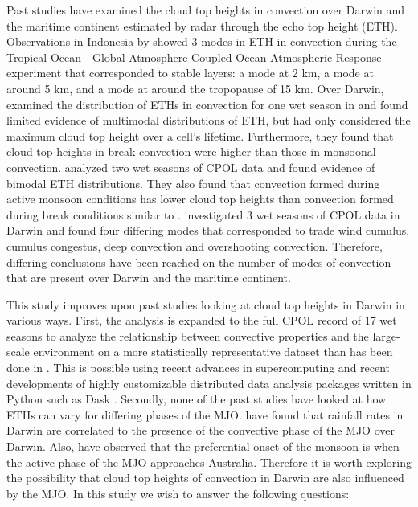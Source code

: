 \documentclass[journal abbreviation, manuscript]{copernicus}
\begin{document}
    Past studies have examined the cloud top heights in convection over Darwin and the maritime continent estimated by radar through the echo top height (ETH). Observations in Indonesia by \cite{Johnsonetal1999} showed 3 modes in ETH in convection during the Tropical Ocean - Global Atmosphere Coupled Ocean Atmospheric Response experiment that corresponded to stable layers: a mode at 2 km, a mode at around 5 km, and a mode at around the tropopause of 15 km. Over Darwin, \cite{MayandBallinger2006} examined the distribution of ETHs in convection for one wet season in and found limited evidence of multimodal distributions of ETH, but had only considered the maximum cloud top height over a cell's lifetime. Furthermore, they found that cloud top heights in break convection were higher than those in monsoonal convection. \cite{Kumaretal2013b} analyzed two wet seasons of CPOL data and found evidence of bimodal ETH distributions. They also found that convection formed during active monsoon conditions has lower cloud top heights than convection formed during break conditions similar to \cite{MayandBallinger2006}. \cite{Kumaretal2013} investigated 3 wet seasons of CPOL data in Darwin and found four differing modes that corresponded to trade wind cumulus, cumulus congestus, deep convection and overshooting convection. Therefore, differing conclusions have been reached on the number of modes of convection that are present over Darwin and the maritime continent. 
    
    This study improves upon past studies looking at cloud top heights in Darwin in various ways. First, the analysis is expanded to the full CPOL record of 17 wet seasons to analyze the relationship between convective properties and the large-scale environment on a more statistically representative dataset than has been done in \cite{Johnsonetal1999, MayandBallinger2006, Kumaretal2013, Kumaretal2013b}. This is possible using recent advances in supercomputing and recent developments of highly customizable distributed data analysis packages written in Python such as Dask \citep{Dask2016}. Secondly, none of the past studies have looked at how ETHs can vary for differing phases of the MJO.  \cite{RauniyarandWalsh2016} have found that rainfall rates in Darwin are correlated to the presence of the convective phase of the MJO over Darwin. Also, \cite{Evansetal2014} have observed that the preferential onset of the monsoon is when the active phase of the MJO approaches Australia. Therefore it is worth exploring the possibility that cloud top heights of convection in Darwin are also influenced by the MJO. In this study we wish to answer the following questions:
    
\end{document}
